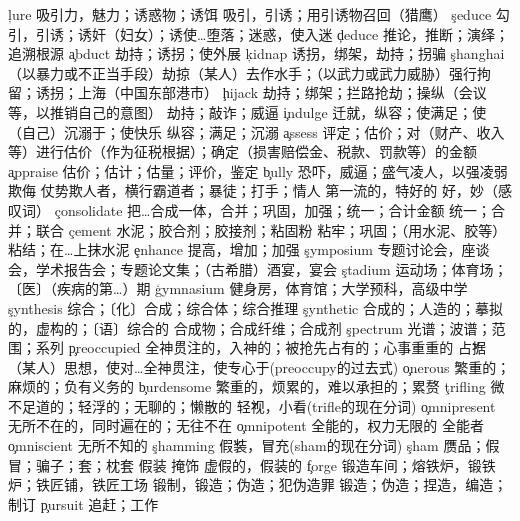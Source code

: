 \begin{multicols}{2}
\c{lure}  \n 吸引力，魅力；诱惑物；诱饵 \vt 吸引，引诱；用引诱物召回（猎鹰）
\c{seduce}  \vt 勾引，引诱；诱奸（妇女）；诱使…堕落；迷惑，使入迷
\c{deduce}  \vt 推论，推断；演绎；追溯根源
\c{abduct}  \vt 劫持；诱拐；使外展
\c{kidnap}  \vt 诱拐，绑架，劫持；拐骗
\c{shanghai}  \vt （以暴力或不正当手段）劫掠（某人）去作水手；（以武力或武力威胁）强行拘留；诱拐；上海（中国东部港市）
\c{hijack}  \vt 劫持；绑架；拦路抢劫；操纵（会议等，以推销自己的意图） \n 劫持；敲诈；威逼
\c{indulge}  \vt 迁就，纵容；使满足；使（自己）沉溺于；使快乐 \vi 纵容；满足；沉溺 
\c{assess}  \vt 评定；估价；对（财产、收入等）进行估价（作为征税根据）；确定（损害赔偿金、税款、罚款等）的金额
\c{appraise}  \vt 估价；估计；估量；评价，鉴定
\c{bully}  \vt 恐吓，威逼；盛气凌人，以强凌弱 \vi 欺侮 \n 仗势欺人者，横行霸道者；暴徒；打手；情人 \a 第一流的，特好的 \int 好，妙（感叹词）
\c{consolidate}  \vt 把…合成一体，合并；巩固，加强；统一；合计金额 \vi 统一；合并；联合
\c{cement}  \n 水泥；胶合剂；胶接剂；粘固粉 \vt 粘牢；巩固；（用水泥、胶等）粘结；在…上抹水泥
\c{enhance}  \vt 提高，增加；加强
\c{symposium}  \n 专题讨论会，座谈会，学术报告会；专题论文集；（古希腊）酒宴，宴会
\c{stadium}  \n 运动场；体育场；〔医〕（疾病的第…）期
\c{gymnasium}  \n 健身房，体育馆；大学预科，高级中学
\c{synthesis}  \n 综合；〔化〕合成；综合体；综合推理
\c{synthetic}  \a 合成的；人造的；摹拟的，虚构的；〔语〕综合的 \n 合成物；合成纤维；合成剂
\c{spectrum}  \n 光谱；波谱；范围；系列
\c{preoccupied}  \a 全神贯注的，入神的；被抢先占有的；心事重重的 \v 占据（某人）思想，使对…全神贯注，使专心于(preoccupy的过去式)
\c{onerous}  \a 繁重的；麻烦的；负有义务的
\c{burdensome}  \a 繁重的，烦累的，难以承担的；累赘
\c{trifling}  \a 微不足道的；轻浮的；无聊的；懒散的 \v 轻视，小看(trifle的现在分词)
\c{omnipresent}  \a 无所不在的，同时遍在的；无往不在
\c{omnipotent}  \a 全能的，权力无限的 \n 全能者
\c{omniscient}  \a 无所不知的
\c{shamming}  \v 假装，冒充(sham的现在分词)
\c{sham}  \n 赝品；假冒；骗子；套；枕套 \vt 假装 \vi 掩饰 \a 虚假的，假装的
\c{forge}  \n 锻造车间；熔铁炉，锻铁炉；铁匠铺，铁匠工场 \vi 锻制，锻造；伪造；犯伪造罪 \vt 锻造；伪造；捏造，编造；制订
\c{pursuit}  \n 追赶；工作

\end{multicols}
